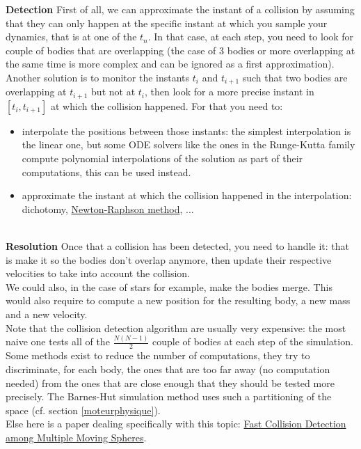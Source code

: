 \documentclass{article}
\begin{document}
\textbf{Detection} First of all, we can approximate the instant of a collision by assuming that they can only happen at the specific instant at which you sample your dynamics, that is at one of the $t_n$. In that case, at each step, you need to look for couple of bodies that are overlapping (the case of 3 bodies or more overlapping at the same time is more complex and can be ignored as a first approximation). \\
Another solution is to monitor the instants $t_i$ and $t_{i+1}$ such that two bodies are overlapping at $t_{i+1}$ but not at $t_i$, then look for a more precise instant in $[t_i, t_{i+1}]$ at which the collision happened. For that you need to:
\begin{itemize}
    \item interpolate the positions between those instants: the simplest interpolation is the linear one, but some ODE solvers like the ones in the Runge-Kutta family compute polynomial interpolations of the solution as part of their computations, this can be used instead.
    \item approximate the instant at which the collision happened in the interpolation: dichotomy, \href{https://en.wikipedia.org/wiki/Newton\%27s_method}{Newton-Raphson method}, ...
\end{itemize}

~\\

\textbf{Resolution} Once that a collision has been detected, you need to handle it: that is make it so the bodies don't overlap anymore, then update their respective velocities to take into account the collision.\\
We could also, in the case of stars for example, make the bodies merge. This would also require to compute a new position for the resulting body, a new mass and a new velocity. \\

Note that the collision detection algorithm are usually very expensive: the most naive one tests all of the $\frac{N(N-1)}{2}$ couple of bodies at each step of the simulation. Some methods exist to reduce the number of computations, they try to discriminate, for each body, the ones that are too far away (no computation needed) from the ones that are close enough that they should be tested more precisely. The Barnes-Hut simulation method uses such a partitioning of the space (cf. section \ref{moteurphysique}). \\
Else here is a paper dealing specifically with this topic: \href{https://www2.cs.duke.edu/courses/cps124/fall01/resources/p373-kim.pdf}{Fast Collision Detection among Multiple Moving Spheres}.
\end{document}
